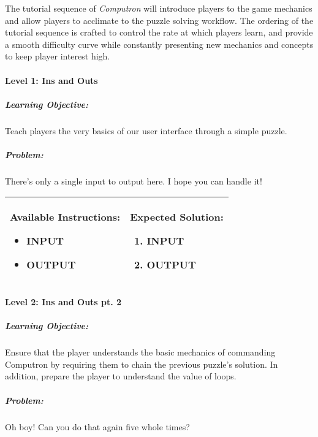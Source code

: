 The tutorial sequence of \textit{Computron} will introduce players to the game mechanics and allow players to acclimate to the puzzle solving workflow. The ordering of the tutorial sequence is crafted to control the rate at which players learn, and provide a smooth difficulty curve while constantly presenting new mechanics and concepts to keep player interest high.\\

\paragraph{Level 1: Ins and Outs}
\subparagraph{Learning Objective:} Teach players the very basics of our user interface through a simple puzzle.

\subparagraph{Problem:} There's only a single input to output here. I hope you can handle it!

\begin{center}
    \begin{tabular}{ | m{5cm} | m{9cm} | } 
        \hline
            \textbf{Available Instructions:} 
            \begin{itemize}
                \setlength\itemsep{-.35em}
                \item INPUT
                \item OUTPUT
            \end{itemize}& 
            \textbf{Expected Solution:} 
            \begin{enumerate}
                \setlength\itemsep{-.35em}
                \item INPUT
                \item OUTPUT
            \end{enumerate}
            \\
        \hline
    \end{tabular}
\end{center}


\paragraph{Level 2: Ins and Outs pt. 2}
\subparagraph{Learning Objective:} Ensure that the player understands the basic mechanics of commanding Computron by requiring them to chain the previous puzzle's solution. In addition, prepare the player to understand the value of loops.

\subparagraph{Problem:} Oh boy! Can you do that again five whole times?


